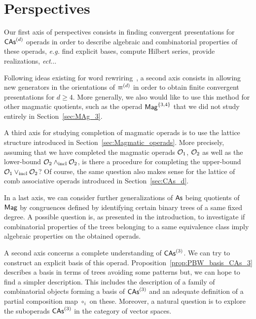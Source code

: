 \section*{Perspectives}


Our first axis of perspectives consists in finding convergent
presentations for $\mathsf{CAs}^{\left(d\right)}$ operads in order to describe algebraic and
combinatorial properties of these operads, \emph{e.g.} find explicit bases,
compute Hilbert series, provide realizations, \emph{ect}...



Following ideas existing for word rewriring~\cite{GGM15}, a second axis
consists in allowing new generators in the orientations of $\operatorname{\equiv}^{(d)}$
in order to obtain finite convergent presentations for $d\geq 4$. More
generally, we also would like to use this method for other magmatic
quotients, such as the operad $\mathsf{Mag}^{\{3, 4\}}$ that we did not study
entirely in Section~\ref{sec:MAg_3}.
\medbreak

A third axis for studying completion of magmatic operads is to use
the lattice structure introduced in Section~\ref{sec:Magmatic_operads}.
More precisely, assuming that we have completed the magmatic operads
$\mathcal{O}_1$, $\mathcal{O}_2$ as well as the lower-bound $\mathcal{O}_2\wedge_{\mathrm{incl}} \mathcal{O}_2$,
is there a procedure for completing the upper-bound
$\mathcal{O}_1\vee_{\mathrm{incl}} \mathcal{O}_2$? Of course, the same question also makes sense
for the lattice of comb associative operads introduced in
Section~\ref{sec:CAs_d}.
\medbreak

In a last axis, we can consider further generalizations of $\mathsf{As}$ being
quotients of $\mathsf{Mag}$ by congruences defined by identifying certain binary
trees of a same fixed degree. A possible question is, as presented in
the introduction, to investigate if combinatorial properties of the
trees belonging to a same equivalence class imply algebraic properties
on the obtained operads.
\medbreak


A second axis concerns a complete understanding of $\mathsf{CAs}^{\left(3\right)}$. We can
try to construct an explicit basis of this operad.
Proposition~\ref{prop:PBW_basis_CAs_3} describes a basis in terms of
trees avoiding some patterns but, we can hope to find a simpler
description. This includes the description of a family of combinatorial
objects forming a basis of $\mathsf{CAs}^{\left(3\right)}$ and an adequate definition of a
partial composition map $\circ_i$ on these. Moreover, a natural
question is to explore the suboperads $\mathsf{CAs}^{\left(3\right)}$ in the category of
vector spaces.
\medbreak
